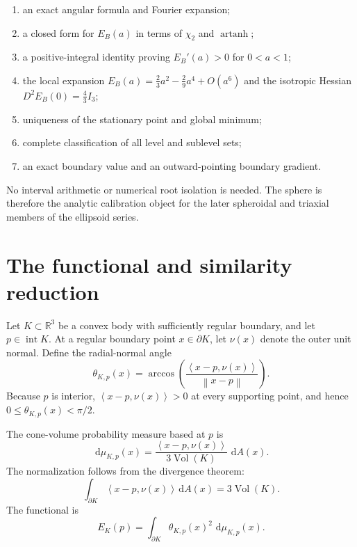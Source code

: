 \documentclass[11pt]{article}
\theoremstyle{definition}
\newcommand{\R}{\mathbb{R}}
\newcommand{\Vol}{\operatorname{Vol}}
\newcommand{\atanh}{\operatorname{artanh}}
\newcommand{\dd}{\,\mathrm{d}}
\newcommand{\ip}[2]{\left\langle #1,#2\right\rangle}
\newcommand{\norm}[1]{\left\lVert #1\right\rVert}
\begin{document}
\begin{enumerate}[label=(\roman*)]
\item an exact angular formula and Fourier expansion;
\item a closed form for $E_B(a)$ in terms of $\chi_2$ and $\atanh$;
\item a positive-integral identity proving $E_B'(a)>0$ for $0<a<1$;
\item the local expansion $E_B(a)=\frac23a^2-\frac29a^4+O(a^6)$ and the isotropic Hessian $D^2E_B(0)=\frac43I_3$;
\item uniqueness of the stationary point and global minimum;
\item complete classification of all level and sublevel sets;
\item an exact boundary value and an outward-pointing boundary gradient.
\end{enumerate}

No interval arithmetic or numerical root isolation is needed.  The sphere is therefore the analytic calibration object for the later spheroidal and triaxial members of the ellipsoid series.

\section{The functional and similarity reduction}

Let $K\subset\R^3$ be a convex body with sufficiently regular boundary, and let $p\in\operatorname{int}K$.  At a regular boundary point $x\in\partial K$, let $\nu(x)$ denote the outer unit normal.  Define the radial-normal angle
\begin{equation}
\theta_{K,p}(x)
=
\arccos\!\left(
\frac{\ip{x-p}{\nu(x)}}{\norm{x-p}}
\right).
\label{eq:angle-def}
\end{equation}
Because $p$ is interior, $\ip{x-p}{\nu(x)}>0$ at every supporting point, and hence $0\leq\theta_{K,p}(x)<\pi/2$.

The cone-volume probability measure based at $p$ is
\begin{equation}
\dd\mu_{K,p}(x)
=
\frac{\ip{x-p}{\nu(x)}}{3\Vol(K)}\,\dd A(x).
\label{eq:cone-measure}
\end{equation}
The normalization follows from the divergence theorem:
\[
\int_{\partial K}\ip{x-p}{\nu(x)}\dd A(x)=3\Vol(K).
\]
The functional is
\begin{equation}
E_K(p)
=
\int_{\partial K}\theta_{K,p}(x)^2\,\dd\mu_{K,p}(x).
\label{eq:functional}
\end{equation}
\end{document}
